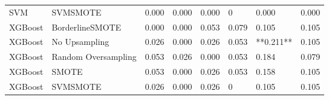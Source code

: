 \begin{tabular}{llllllll}
                            SVM &                      SVMSMOTE & 0.000 &                     0.000 &                 0.000 &                      0 &                                   0.000 &    0.000 \\
                        XGBoost &               BorderlineSMOTE & 0.000 &                     0.000 &                 0.053 &                  0.079 &                                   0.105 &    0.105 \\
                        XGBoost &                 No Upsampling & 0.026 &                     0.000 &                 0.026 &                  0.053 &                               **0.211** &    0.105 \\
                        XGBoost &           Random Oversampling & 0.053 &                     0.026 &                 0.000 &                  0.053 &                                   0.184 &    0.079 \\
                        XGBoost &                         SMOTE & 0.053 &                     0.000 &                 0.026 &                  0.053 &                                   0.158 &    0.105 \\
                        XGBoost &                      SVMSMOTE & 0.026 &                     0.000 &                 0.026 &                      0 &                                   0.105 &    0.105 \\
\bottomrule
\end{tabular}
